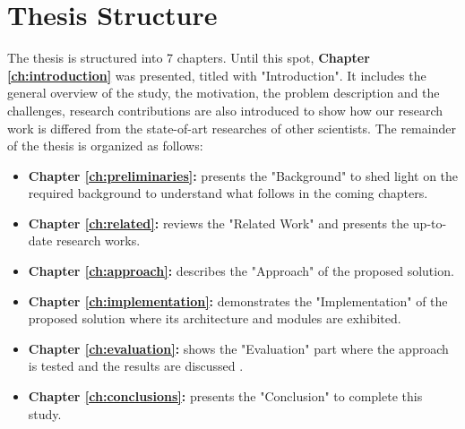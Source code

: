\section {Thesis Structure}
The thesis is structured into 7 chapters. Until this spot, \textbf{Chapter \ref{ch:introduction}} was presented, titled with "Introduction". It  includes the general overview of the study, the motivation, the problem description and the challenges, research contributions are also introduced to show how our research work is differed from the state-of-art researches of other scientists. The
remainder of the thesis is organized as follows:
\begin{itemize}
	\item { \textbf{Chapter \ref{ch:preliminaries}:} presents the "Background" to shed light on the required background to understand what follows in the coming chapters.}
	
	\item {\textbf{Chapter \ref{ch:related}:}} reviews the "Related Work" and presents the up-to-date research works. 
		
	\item {\textbf{Chapter \ref{ch:approach}:}} describes the "Approach" of the proposed solution. 
	
	\item {\textbf{Chapter \ref{ch:implementation}:}} demonstrates the "Implementation" of the proposed solution where its architecture and modules are exhibited.
	
	\item {\textbf{Chapter \ref{ch:evaluation}:}} shows the "Evaluation" part where the approach is tested and the results are discussed .

	\item {\textbf{Chapter \ref{ch:conclusions}:}} presents the "Conclusion" to complete this study.
\end{itemize}






